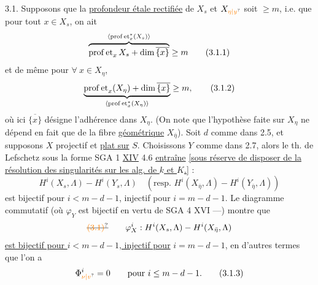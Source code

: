  3.1. Supposons que la \uline{profondeur étale rectifiée}  de $X_s$ et $X_{\unsure{\eta|y}}$ soit $\geq m$, i.e. que pour tout $x\in X_s$, on ait
\[
\overbrace{\operatorname{prof\,et}_x X_s+\dim\overline{\{x\}}}^{\inserted{\operatorname{prof\,et}_x^{*}(X_s)}}\geq m
\tag*{(3.1.1)}
\]
et de même pour $\forall\ x\in X_\eta$,
\[
\underbrace{\operatorname{prof\,et}_x(X_\eta)+\dim\overline{\{x\}}}_{\inserted{\operatorname{prof\,et}_x^{*}(X_\eta)}}\geq m,
\tag*{(3.1.2)}
\]
où ici $\overline{\{x\}}$ désigne l'adhérence dans $X_\eta$. (On note que l'hypothèse faite sur $X_\eta$ ne dépend en fait que de la fibre \uline{géométrique} $X_{\bar\eta}$).
 Soit $d$ comme dans 2.5, et supposons  $X$ projectif et \uline{plat sur} $S$.
Choisissons $Y$ comme dans 2.7, alors le th. de Lefschetz   sous la forme SGA 1 \uline{XIV} 4.6 \uline{entraîne} \uline{[sous réserve de disposer de la résolution des singularités sur  les  alg. de $k$ et $K$.]} :
\[
H^i(X_s,\Lambda)\mathbin{-}H^i(Y_s,\Lambda)
\quad(\text{resp. }H^i(X_{\bar\eta},\Lambda)\mathbin{-}H^i(Y_{\bar\eta},\Lambda))
\]
est bijectif pour $i<m-d-1$, injectif pour $i=m-d-1$. Le diagramme commutatif
(où $\varphi_Y$ est bijectif en vertu de SGA 4 XVI ---) montre que 
\[
\deleted{\unsure{\text{(3.1)}}}\qquad\varphi_X^i:H^i(X_s,\Lambda)\mathbin{-}H^i(X_{\bar\eta},\Lambda)
\]
\uline{est bijectif pour $i<m-d-1$, injectif pour} $i=m-d-1$,
en d'autres termes que l'on a
\[
\Phi^i_{\unsure{\nu|v}}=0\qquad\text{pour }i\leq m-d-1.
\tag*{(3.1.3)}
\]
